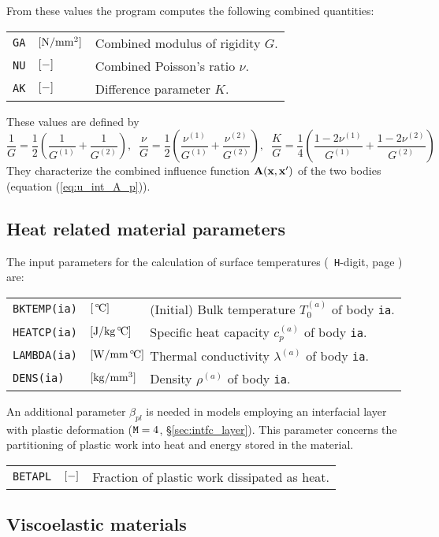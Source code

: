 \documentclass[12pt]{report}
\newcommand{\var}[1]{\mbox{\tt #1}}
\newenvironment{inputvars}{\vspace{0.4\baselineskip}%

\begin{tabular}{>{\raggedright}p{22mm}p{19mm}p{113mm}}}{
\end{tabular}

}
\newcommand{\inpvar}[3]{{\small\tt #1} & $#2$ & #3 \\[1ex]}
\begin{document}
From these values the program computes the following combined quantities:
\begin{inputvars}
\inpvar{GA}{\bunit{N/mm^2}}{Combined modulus of rigidity $G$.}
\inpvar{NU}{\bunit{-}}{Combined Poisson's ratio $\nu$.}
\inpvar{AK}{\bunit{-}}{Difference parameter $K$.}
\end{inputvars}

These values are defined by
\begin{equation}\label{eq:combined_mater}
 \frac{1}{G} = \frac{1}{2} \left(
                \frac{1}{G^{(1)}} + \frac{1}{G^{(2)}} \right), \;\;
 \frac{\nu}{G} = \frac{1}{2} \left(
        \frac{\nu^{(1)}}{G^{(1)}} + \frac{\nu^{(2)}}{G^{(2)}} \right), \;\;
 \frac{K}{G} = \frac{1}{4} \left(
        \frac{1 - 2\nu^{(1)}}{G^{(1)}} + \frac{1 - 2\nu^{(2)}}{G^{(2)}} \right)
\end{equation}
They characterize the combined influence function $\mathbf{A}(\mathbf{x},\mathbf{x}')$
of the two bodies (equation (\ref{eq:u_int_A_p})).

\subsection{Heat related material parameters}
\label{sec:heat_param}

The input parameters for the calculation of surface temperatures ({\tt
H}-digit, page \pageref{h-digit}) are:
\begin{inputvars}
\inpvar{BKTEMP(ia)}{\bunit{\celc}}{(Initial) Bulk temperature $T_0^{(a)}$ of
        body \var{ia}.}
\inpvar{HEATCP(ia)}{\bunit{J/kg \celc}}{Specific heat capacity $c_p^{(a)}$
        of body \var{ia}.}
\inpvar{LAMBDA(ia)}{\bunit{W/mm \celc}\hspace{-10mm}}{Thermal conductivity 
        $\lambda^{(a)}$ of body \var{ia}.}
\inpvar{DENS(ia)}{\bunit{kg/mm^3}}{Density $\rho^{(a)}$ of body \var{ia}.}
\end{inputvars}
An additional parameter $\beta_{pl}$ is needed in models employing an
interfacial layer with plastic deformation (${\tt M}=4$,
\S\ref{sec:intfc_layer}). This parameter concerns the
partitioning of plastic work into heat and energy stored in the material.
\begin{inputvars}
\inpvar{BETAPL}{\bunit{-}}{Fraction of plastic work dissipated as heat.}
\end{inputvars}

\subsection{Viscoelastic materials}
\label{sec:visc_elast}
\end{document}
